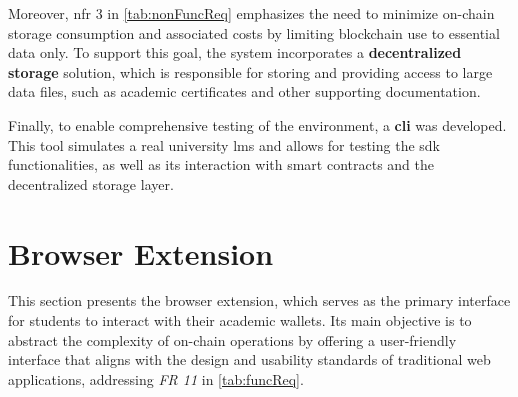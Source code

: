Moreover, \gls{nfr} 3 in \cref{tab:nonFuncReq} emphasizes the need to minimize on-chain storage consumption and associated costs by limiting blockchain use to essential data only. To support this goal, the system incorporates a \textbf{decentralized storage} solution, which is responsible for storing and providing access to large data files, such as academic certificates and other supporting documentation.

Finally, to enable comprehensive testing of the environment, a \textbf{\gls{cli}} was developed. This tool simulates a real university \gls{lms} and allows for testing the \gls{sdk} functionalities, as well as its interaction with smart contracts and the decentralized storage layer.

 \section{Browser Extension}
\label{sec:browserExtensionDesign}
This section presents the browser extension, which serves as the primary interface for students to interact with their academic wallets. Its main objective is to abstract the complexity of on-chain operations by offering a user-friendly interface that aligns with the design and usability standards of traditional web applications, addressing \textit{FR 11} in \cref{tab:funcReq}.

